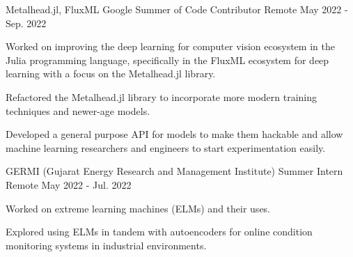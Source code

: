\begin{cventries}

  \cventry
    {Metalhead.jl, FluxML} %
    {Google Summer of Code Contributor} %
    {Remote} %
    {May 2022 - Sep. 2022} %
    {
      \begin{cvitems}
        \item {Worked on improving the deep learning for computer vision ecosystem in the
        Julia programming language, specifically in the FluxML ecosystem for deep learning
        with a focus on the Metalhead.jl library.}
        \item{Refactored the Metalhead.jl library to incorporate more modern training
        techniques and newer-age models.}
        \item{Developed a general purpose API for models to make them hackable and
        allow machine learning researchers and engineers to start experimentation easily.}
      \end{cvitems}
    }

  \cventry
    {GERMI (Gujarat Energy Research and Management Institute)} %
    {Summer Intern} %
    {Remote} %
    {May 2022 - Jul. 2022} %
    {
      \begin{cvitems}
        \item {Worked on extreme learning machines (ELMs) and their uses.}
        \item {Explored using ELMs in tandem with autoencoders for online condition 
        monitoring systems in industrial environments.}
      \end{cvitems} 
    }

\end{cventries}
